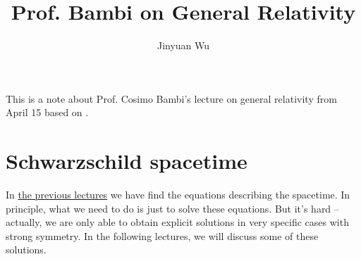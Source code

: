 \documentclass[hyperref, a4paper]{article}
\title{Prof. Bambi on General Relativity}
\author{Jinyuan Wu}
\begin{document}
\maketitle

This is a note about Prof. Cosimo Bambi's lecture on general relativity from April 15 based on \cite{bambi2018introduction}.

\section{Schwarzschild spacetime}

In \href{./2022-4-15.pdf}{the previous lectures} we have find the equations describing the spacetime.
In principle, what we need to do is just to solve these equations. But it's hard -- actually, we are 
only able to obtain explicit solutions in very specific cases with strong symmetry. In the following 
lectures, we will discuss some of these solutions.
\end{document}

